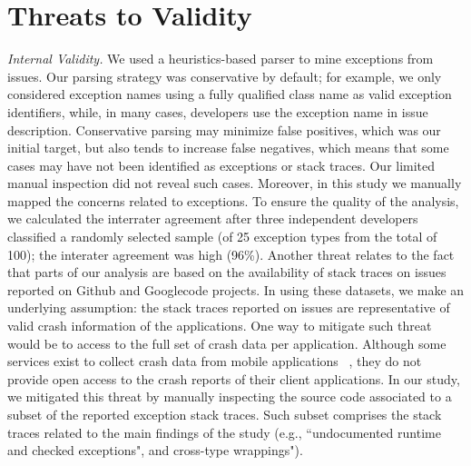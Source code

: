 \documentclass[conference]{IEEEtran}
\begin{document}
\section{Threats to Validity}
\label{sec:threats}

\emph{Internal Validity.} We used a heuristics-based parser to mine
exceptions from issues.  Our parsing strategy was conservative by default; for
example, we only considered exception names using a fully qualified class name
as valid exception identifiers, while, in many cases, developers use the
exception name in issue description. Conservative parsing may minimize false
positives, which was our initial target, but also tends to increase false
negatives, which means that some cases may have not been identified as
exceptions or stack traces. Our limited manual inspection did not reveal such
cases. Moreover, in this study we manually mapped the concerns related to exceptions.
 To ensure the quality of the analysis, we calculated the interrater agreement after three independent 
developers classified a randomly selected sample (of 25 exception 
types from the total of 100); the interater agreement was high (96\%). 
Another threat relates to the fact that parts of our analysis 
are based on the availability of stack traces on issues reported on Github and Googlecode projects. 
In using these datasets, we make an underlying assumption: the stack traces reported on issues are 
representative of valid crash information of the applications. 
One way to mitigate such threat would be to access to the full 
set of crash data per application. Although some services exist 
to collect crash data from mobile applications ~\cite{BugSe14,BugSn14,Googl14,Acra14},
they do not provide open access to the crash reports of their client applications.
In our study, we mitigated this threat by manually inspecting
the source code associated to a subset of the reported exception stack traces.
Such subset comprises the stack traces related to the main findings 
of the study (e.g., ``undocumented runtime and checked exceptions",
and cross-type wrappings").
\end{document}
